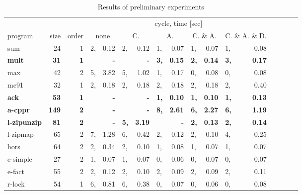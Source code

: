 \begin{table*}
\caption{Results of preliminary experiments}
\label{tbl:exp}
\small
\begin{center}
\begin{tabular}{|l|r|r|p{0pt}r|p{0pt}r|p{0pt}r|p{0pt}r|p{0pt}r|p{0pt}r|p{0pt}r|}
\hline
            &       &    & \multicolumn{10}{|c|}{cycle, time [sec]} \\
\cline{4-13}
program    & size & order & \multicolumn{2}{c}{none} &     \multicolumn{2}{|c|}{C.} &   \multicolumn{2}{|c|}{A.} & \multicolumn{2}{|c|}{C. \& A.} & \multicolumn{2}{|c|}{C. \& A. \& D.} \\
\hline
sum               &    24&  1&  2,&    0.12  &  2,&    0.12  &  1,&    0.07  &  1,&    0.07  &  1,&    0.08  \\
\bf mult              & \bf    31& \bf  1& \bf    & \bf       -  & \bf    & \bf       -  & \bf  3,& \bf    0.15  & \bf  2,& \bf    0.14  & \bf  3,& \bf    0.17  \\
max               &    42&  2&  5,&    3.82  &  5,&    1.02  &  1,&    0.17  &  0,&    0.08  &  0,&    0.08  \\
mc91              &    32&  1&  2,&    0.18  &  2,&    0.18  &  2,&    0.18  &  2,&    0.18  &  2,&    0.40  \\
\bf ack               & \bf    53& \bf  1& \bf    & \bf       -  & \bf    & \bf       -  & \bf  1,& \bf    0.10  & \bf  1,& \bf    0.10  & \bf  1,& \bf    0.13  \\
\bf a-cppr            & \bf   149& \bf  2& \bf    & \bf       -  & \bf    & \bf       -  & \bf  8,& \bf    2.61  & \bf  6,& \bf    2.27  & \bf  6,& \bf    1.19  \\
\bf l-zipunzip        & \bf    81& \bf  2& \bf    & \bf       -  & \bf  5,& \bf    3.19  & \bf    & \bf       -  & \bf  2,& \bf    0.13  & \bf  2,& \bf    0.14  \\
l-zipmap          &    65&  2&  7,&    1.28  &  6,&    0.42  &  2,&    0.12  &  2,&    0.10  &  4,&    0.25  \\
hors              &    64&  2&  2,&    0.34  &  2,&    0.10  &  1,&    0.08  &  1,&    0.07  &  1,&    0.07  \\
e-simple          &    27&  2&  1,&    0.07  &  1,&    0.07  &  0,&    0.06  &  0,&    0.07  &  0,&    0.07  \\
e-fact            &    55&  2&  2,&    0.12  &  2,&    0.10  &  2,&    0.09  &  2,&    0.09  &  2,&    0.11  \\
r-lock            &    54&  1&  6,&    0.81  &  6,&    0.38  &  0,&    0.07  &  0,&    0.06  &  0,&    0.08  \\

\end{tabular}
\end{center}
\end{table*}
